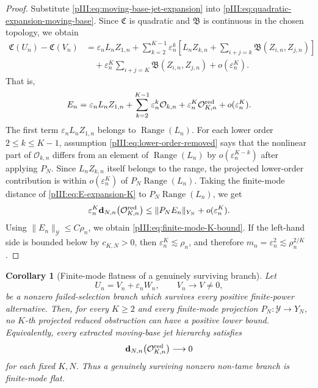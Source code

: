 \documentclass[11pt]{article}
\numberwithin{equation}{section}
\theoremstyle{plain}
\newtheorem{corollary}{Corollary}[section]
\theoremstyle{definition}
\theoremstyle{remark}
\DeclareMathOperator{\Range}{Range}
\newcommand{\calB}{\mathfrak B}
\newcommand{\calC}{\mathfrak C}
\newcommand{\calY}{\mathcal Y}
\begin{document}
\begin{proof}
Substitute \eqref{pIII:eq:moving-base-jet-expansion} into
\eqref{pIII:eq:quadratic-expansion-moving-base}.  Since \(\calC\) is quadratic and \(\calB\) is continuous
in the chosen topology, we obtain
\[
\begin{aligned}
        \calC(U_n)-\calC(V_n)
        &=
        \varepsilon_nL_nZ_{1,n}
        +
        \sum_{k=2}^{K-1}\varepsilon_n^k
        \left[
        L_nZ_{k,n}
        +
        \sum_{i+j=k}\calB(Z_{i,n},Z_{j,n})
        \right]  \\
        &\quad+
        \varepsilon_n^K
        \sum_{i+j=K}\calB(Z_{i,n},Z_{j,n})
        +o(\varepsilon_n^K).
\end{aligned}
\]
That is,
\begin{equation}\label{pIII:eq:E-expansion-K}
        E_n
        =
        \varepsilon_nL_nZ_{1,n}
        +
        \sum_{k=2}^{K-1}\varepsilon_n^k\mathcal O_{k,n}
        +
        \varepsilon_n^K\mathcal O^{\rm red}_{K,n}
        +o(\varepsilon_n^K).
\end{equation}
The first term \(\varepsilon_nL_nZ_{1,n}\) belongs to \(\Range(L_n)\).  For each lower order
\(2\le k\le K-1\), assumption \eqref{pIII:eq:lower-order-removed} says that the nonlinear part of
\(\mathcal O_{k,n}\) differs from an element of \(\Range(L_n)\) by
\(o(\varepsilon_n^{K-k})\) after applying \(P_N\).  Since \(L_nZ_{k,n}\) itself belongs to the range,
the projected lower-order contribution is within \(o(\varepsilon_n^K)\) of \(P_N\Range(L_n)\).
Taking the finite-mode distance of \eqref{pIII:eq:E-expansion-K} to \(P_N\Range(L_n)\), we get
\[
        \varepsilon_n^K
        \mathbf d_{N,n}\bigl(\mathcal O^{\rm red}_{K,n}\bigr)
        \le
        \|P_NE_n\|_{Y_N}+o(\varepsilon_n^K).
\]
Using \(\|E_n\|_{\calY}\le C\rho_n\), we obtain \eqref{pIII:eq:finite-mode-K-bound}.  If the left-hand side
is bounded below by \(c_{K,N}>0\), then \(\varepsilon_n^K\lesssim\rho_n\), and therefore
\(m_n=\varepsilon_n^2\lesssim\rho_n^{2/K}\).
\end{proof}

\begin{corollary}[Finite-mode flatness of a genuinely surviving branch]
\label{pIII:cor:surviving-branch-finite-mode-flat}
Let
\[
        U_n=V_n+\varepsilon_nW_n,
        \qquad
        V_n\to V\neq0,
\]
be a nonzero failed-selection branch which survives every positive finite-power alternative.
Then, for every \(K\ge2\) and every finite-mode projection \(P_N:\calY\to Y_N\), no \(K\)-th
projected reduced obstruction can have a positive lower bound.  Equivalently, every extracted
moving-base jet hierarchy satisfies
\[
        \mathbf d_{N,n}\bigl(\mathcal O^{\rm red}_{K,n}\bigr)
        \longrightarrow0
\]
for each fixed \(K,N\).  Thus a genuinely surviving nonzero non-tame branch is finite-mode flat.
\end{corollary}
\end{document}
